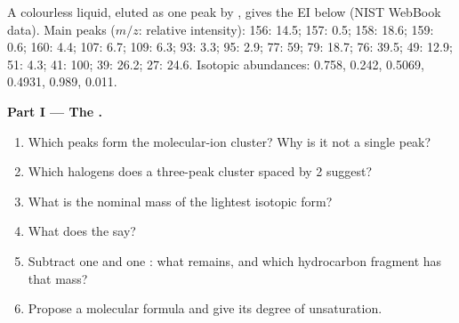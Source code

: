 \begin{problem}
\label{pb:b2:mass-spec-atomic:1}
A colourless liquid, eluted as one peak by , gives the EI  below (NIST
WebBook data). Main peaks ($m/z$: relative intensity): 156: 14.5; 157: 0.5; 158: 18.6; 159: 0.6; 160:
4.4; 107: 6.7; 109: 6.3; 93: 3.3; 95: 2.9; 77: 59; 79: 18.7; 76: 39.5; 49: 12.9; 51: 4.3; 41: 100; 39:
26.2; 27: 24.6. Isotopic abundances:  0.758,  0.242,  0.5069,
 0.4931,  0.989,  0.011.

\begin{center}
\end{center}

\medskip
\noindent\textbf{Part I --- The .}
\begin{enumerate}
  \item Which peaks form the molecular-ion cluster? Why is it not a single peak?
  \item Which halogens does a three-peak cluster spaced by 2 suggest?
  \item What is the nominal mass of the lightest isotopic form?
  \item What does the  say?
  \item Subtract one  and one : what remains, and which hydrocarbon fragment
        has that mass?
  \item Propose a molecular formula and give its degree of unsaturation.
\end{enumerate}


\end{problem}
